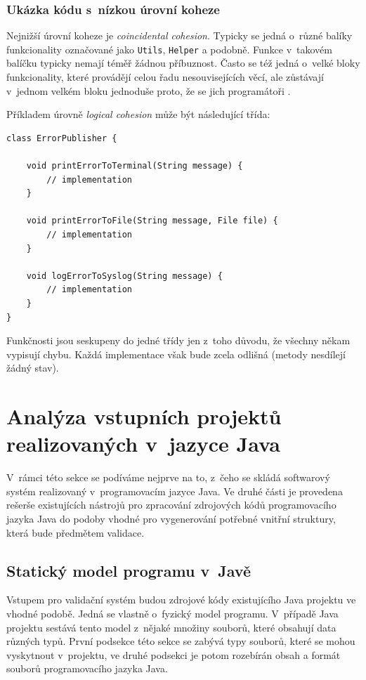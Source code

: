 \subsubsection{Ukázka kódu s~nízkou úrovní koheze}
Nejnižší úrovní koheze je \emph{coincidental cohesion}. Typicky se jedná o~různé balíky funkcionality označované jako \verb+Utils+, \verb+Helper+ a podobně. Funkce v~takovém balíčku typicky nemají téměř žádnou příbuznost. Často se též jedná o~velké bloky funkcionality, které provádějí celou řadu nesouvisejících věcí, ale zůstávají v~jednom velkém bloku jednoduše proto, že se jich programátoři .

Příkladem úrovně \emph{logical cohesion} může být následující třída:

\begin{lstlisting}
class ErrorPublisher {

    void printErrorToTerminal(String message) {
        // implementation
    }

    void printErrorToFile(String message, File file) {
        // implementation
    }

    void logErrorToSyslog(String message) {
        // implementation
    }
}
\end{lstlisting}

Funkčnosti jsou seskupeny do jedné třídy jen z~toho důvodu, že všechny někam vypisují chybu. Každá implementace však bude zcela odlišná (metody nesdílejí žádný stav).

\section{Analýza vstupních projektů realizovaných v~jazyce Java}

V~rámci této sekce se podíváme nejprve na to, z~čeho se skládá softwarový systém realizovaný v~programovacím jazyce Java. Ve druhé části je provedena rešerše existujících nástrojů pro zpracování zdrojových kódů programovacího jazyka Java do podoby vhodné pro vygenerování potřebné vnitřní struktury, která bude předmětem validace.

\subsection{Statický model programu v~Javě}
Vstupem pro validační systém budou zdrojové kódy existujícího Java projektu ve vhodné podobě. Jedná se vlastně o~fyzický model programu. V~případě Java projektu sestává tento model z~nějaké množiny souborů, které obsahují data různých typů. První podsekce této sekce se zabývá typy souborů, které se mohou vyskytnout v~projektu, ve druhé podsekci je potom rozebírán obsah a formát souborů programovacího jazyka Java.

